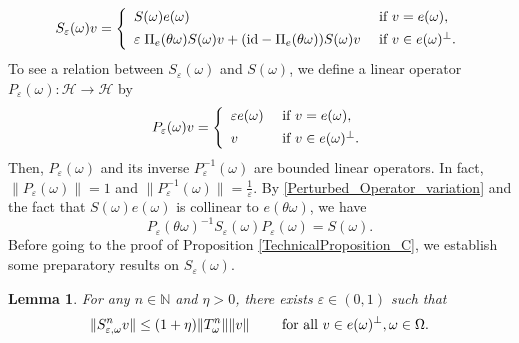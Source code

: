 \documentclass[pdflatex,sn-mathphys-num]{sn-jnl}%
\theoremstyle{thmstyleone}%
\theoremstyle{thmstyletwo}%
\newtheorem{lemma}{Lemma}
\theoremstyle{thmstylethree}%
\newcommand{\N}{\mathbb{N}}
\newcommand{\cH}{\mathcal{H}}
\newcommand{\id}{\hbox{id}}
\newcommand{\eps}{\varepsilon}
\numberwithin{equation}{section}
\begin{document}
\begin{equation}\label{Perturbed_Operator_variation}
S_{\eps}(\omega) v
=
\left\{
\begin{array}{ll}
   S(\omega)e(\omega)  & \hbox{ if } v=e(\omega),  \\[1ex]
  \eps\; \Pi_e(\theta\omega) S(\omega)v +(\id-\Pi_e(\theta\omega)) S(\omega)v    &  \hbox{ if } v\in e(\omega)^{\perp}.
\end{array}
\right.
\end{equation}
%
To see a relation between $S_{\eps}(\omega)$ and $S(\omega)$, we define a linear operator $P_\eps(\omega):\cH\rightarrow \cH$ by 
\[
P_{\eps}(\omega) v=\left\{
\begin{array}{ll}
    \eps e(\omega) & \hbox{ if } v=e(\omega), \\[1ex]
      v& \hbox{ if } v\in e(\omega)^{\perp}. 
\end{array}
\right.
\]
Then, $P_{\eps}(\omega)$ and its inverse $P_{\eps}^{-1}(\omega)$ are bounded linear operators. In fact, $\|P_{\eps}(\omega)\|=1$ and $\|P_{\eps}^{-1}(\omega)\|=\frac{1}{\eps}$. By \eqref{Perturbed_Operator_variation} and the fact that $S(\omega)e(\omega)$ is collinear to $e(\theta\omega)$, we have
\begin{equation}\label{Relation_01}
P_{\eps}(\theta\omega)^{-1} S_{\eps}(\omega) P_{\eps}(\omega)
=
S(\omega).
\end{equation}
Before going to the proof of Proposition \ref{TechnicalProposition_C}, we establish some preparatory results on $S_{\eps}(\omega)$.
%
%
\begin{lemma}\label{TechnicalLemma3} For any $n\in\N$ and $\eta>0$, there exists $\eps\in (0,1)$ such that 
\[
\|S_{\eps,\omega}^n v\|\leq (1+\eta)\|T_{\omega}^n\|\| v\|\qquad \hbox{ for all } v\in e(\omega)^{\perp}, \omega\in \Omega.
\]
\end{lemma}
\end{document}
